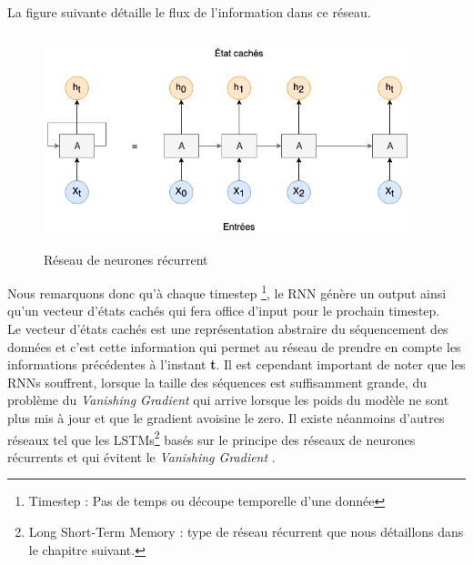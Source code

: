 La figure suivante \cite{rnnschema} détaille le flux de l'information dans ce réseau.
\begin{figure}[H]
    \centering
    \includegraphics[height=175pt,width=300pt]{images/chap2/RNN.png}
    \caption{Réseau de neurones récurrent}
\end{figure}

Nous remarquons donc qu'à chaque timestep \footnote{Timestep : Pas de temps ou découpe temporelle d'une donnée}, le RNN génère un output ainsi qu'un vecteur d'états cachés qui fera office d'input pour le prochain timestep. \\
Le vecteur d'états cachés est une représentation abstraire du séquencement des données et c'est cette information qui permet au réseau de prendre en compte les informations précédentes à l'instant \textbf{t}. Il est cependant important de noter que les RNNs souffrent, lorsque la taille des séquences est suffisamment grande, du problème du \textit{Vanishing Gradient} qui arrive lorsque les poids du modèle ne sont plus mis à jour et que le gradient avoisine le zero. Il existe néanmoins d'autres réseaux tel que les LSTMs\footnote{Long Short-Term Memory : type de réseau récurrent que nous détaillons dans le chapitre suivant.} basés sur le principe des réseaux de neurones récurrents et qui évitent le \textit{Vanishing Gradient} \cite{vanishinggradient}.  

